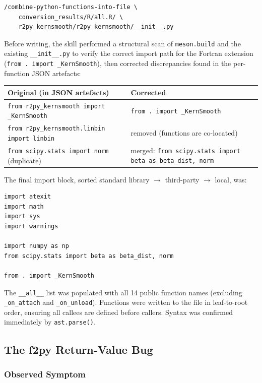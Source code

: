 \documentclass[12pt,a4paper]{article}
\begin{document}
\begin{lstlisting}[style=shell]
/combine-python-functions-into-file \
    conversion_results/R/all.R/ \
    r2py_kernsmooth/r2py_kernsmooth/__init__.py
\end{lstlisting}

Before writing, the skill performed a structural scan of \texttt{meson.build} and the existing \texttt{\_\_init\_\_.py} to verify the correct import path for the Fortran extension (\texttt{from~.~import~\_KernSmooth}), then corrected discrepancies found in the per-function JSON artefacts:

\begin{center}
\begin{tabular}{p{}p{}}
\toprule
Original (in JSON artefacts) & Corrected \\
\midrule
\texttt{from r2py\_kernsmooth import \_KernSmooth} &
  \texttt{from . import \_KernSmooth} \\
\texttt{from r2py\_kernsmooth.linbin import linbin} &
  removed (functions are co-located) \\
\texttt{from scipy.stats import norm} (duplicate) &
  merged: \texttt{from scipy.stats import beta as beta\_dist, norm} \\
\bottomrule
\end{tabular}
\end{center}

The final import block, sorted standard library $\to$ third-party $\to$ local, was:

\begin{lstlisting}[style=python]
import atexit
import math
import sys
import warnings

import numpy as np
from scipy.stats import beta as beta_dist, norm

from . import _KernSmooth
\end{lstlisting}

The \texttt{\_\_all\_\_} list was populated with all 14 public function names (excluding \texttt{\_on\_attach} and \texttt{\_on\_unload}). Functions were written to the file in leaf-to-root order, ensuring all callees are defined before callers. Syntax was confirmed immediately by \texttt{ast.parse()}.

\subsection{The f2py Return-Value Bug}

\subsubsection{Observed Symptom}
\end{document}
